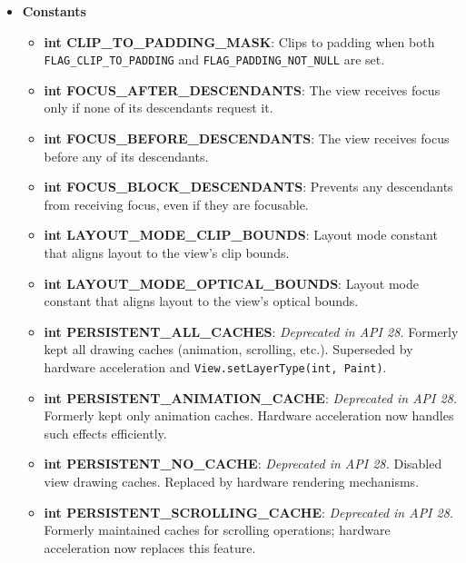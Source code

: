 \documentclass{report}
\begin{document}
\begin{itemize}
        \item \textbf{Constants}
            \begin{itemize}
                \item \textbf{int CLIP\_TO\_PADDING\_MASK}: Clips to padding when both \texttt{FLAG\_CLIP\_TO\_PADDING} and \texttt{FLAG\_PADDING\_NOT\_NULL} are set.
                \item \textbf{int FOCUS\_AFTER\_DESCENDANTS}: The view receives focus only if none of its descendants request it.
                \item \textbf{int FOCUS\_BEFORE\_DESCENDANTS}: The view receives focus before any of its descendants.
                \item \textbf{int FOCUS\_BLOCK\_DESCENDANTS}: Prevents any descendants from receiving focus, even if they are focusable.
                \item \textbf{int LAYOUT\_MODE\_CLIP\_BOUNDS}: Layout mode constant that aligns layout to the view’s clip bounds.
                \item \textbf{int LAYOUT\_MODE\_OPTICAL\_BOUNDS}: Layout mode constant that aligns layout to the view’s optical bounds.
                \item \textbf{int PERSISTENT\_ALL\_CACHES}: \textit{Deprecated in API 28.} Formerly kept all drawing caches (animation, scrolling, etc.). Superseded by hardware acceleration and \texttt{View.setLayerType(int, Paint)}.
                \item \textbf{int PERSISTENT\_ANIMATION\_CACHE}: \textit{Deprecated in API 28.} Formerly kept only animation caches. Hardware acceleration now handles such effects efficiently.
                \item \textbf{int PERSISTENT\_NO\_CACHE}: \textit{Deprecated in API 28.} Disabled view drawing caches. Replaced by hardware rendering mechanisms.
                \item \textbf{int PERSISTENT\_SCROLLING\_CACHE}: \textit{Deprecated in API 28.} Formerly maintained caches for scrolling operations; hardware acceleration now replaces this feature.
            \end{itemize}

    \end{itemize}

    \pagebreak 
\end{document}
